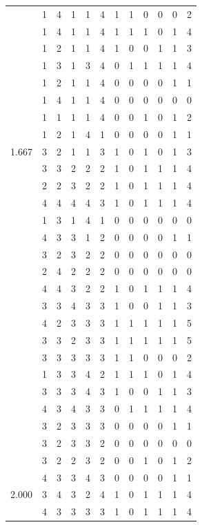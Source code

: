\documentclass[]{msu-thesis}
\theoremstyle{definition}
\theoremstyle{definition}
\theoremstyle{definition}
\theoremstyle{remark}
\begin{document}
\begin{table}
{\begin{tabular}[t]{rrrrrrrrrrrr}
 & 1 & 4 & 1 & 1 & 4 & 1 & 1 & 0 & 0 & 0 & 2\\
 & 1 & 4 & 1 & 1 & 4 & 1 & 1 & 1 & 0 & 1 & 4\\
 & 1 & 2 & 1 & 1 & 4 & 1 & 0 & 0 & 1 & 1 & 3\\
 & 1 & 3 & 1 & 3 & 4 & 0 & 1 & 1 & 1 & 1 & 4\\
 & 1 & 2 & 1 & 1 & 4 & 0 & 0 & 0 & 0 & 1 & 1\\
 & 1 & 4 & 1 & 1 & 4 & 0 & 0 & 0 & 0 & 0 & 0\\
 & 1 & 1 & 1 & 1 & 4 & 0 & 0 & 1 & 0 & 1 & 2\\
 & 1 & 2 & 1 & 4 & 1 & 0 & 0 & 0 & 0 & 1 & 1\\
1.667 & 3 & 2 & 1 & 1 & 3 & 1 & 0 & 1 & 0 & 1 & 3\\
 & 3 & 3 & 2 & 2 & 2 & 1 & 0 & 1 & 1 & 1 & 4\\
 & 2 & 2 & 3 & 2 & 2 & 1 & 0 & 1 & 1 & 1 & 4\\
 & 4 & 4 & 4 & 4 & 3 & 1 & 0 & 1 & 1 & 1 & 4\\
 & 1 & 3 & 1 & 4 & 1 & 0 & 0 & 0 & 0 & 0 & 0\\
 & 4 & 3 & 3 & 1 & 2 & 0 & 0 & 0 & 0 & 1 & 1\\
 & 3 & 2 & 3 & 2 & 2 & 0 & 0 & 0 & 0 & 0 & 0\\
 & 2 & 4 & 2 & 2 & 2 & 0 & 0 & 0 & 0 & 0 & 0\\
 & 4 & 4 & 3 & 2 & 2 & 1 & 0 & 1 & 1 & 1 & 4\\
 & 3 & 3 & 4 & 3 & 3 & 1 & 0 & 0 & 1 & 1 & 3\\
 & 4 & 2 & 3 & 3 & 3 & 1 & 1 & 1 & 1 & 1 & 5\\
 & 3 & 3 & 2 & 3 & 3 & 1 & 1 & 1 & 1 & 1 & 5\\
 & 3 & 3 & 3 & 3 & 3 & 1 & 1 & 0 & 0 & 0 & 2\\
 & 1 & 3 & 3 & 4 & 2 & 1 & 1 & 1 & 0 & 1 & 4\\
 & 3 & 3 & 3 & 4 & 3 & 1 & 0 & 0 & 1 & 1 & 3\\
 & 4 & 3 & 4 & 3 & 3 & 0 & 1 & 1 & 1 & 1 & 4\\
 & 3 & 2 & 3 & 3 & 3 & 0 & 0 & 0 & 0 & 1 & 1\\
 & 3 & 2 & 3 & 3 & 2 & 0 & 0 & 0 & 0 & 0 & 0\\
 & 3 & 2 & 2 & 3 & 2 & 0 & 0 & 1 & 0 & 1 & 2\\
 & 4 & 3 & 3 & 4 & 3 & 0 & 0 & 0 & 0 & 1 & 1\\
2.000 & 3 & 4 & 3 & 2 & 4 & 1 & 0 & 1 & 1 & 1 & 4\\
 & 4 & 3 & 3 & 3 & 3 & 1 & 0 & 1 & 1 & 1 & 4\\

\end{tabular}}
\end{table}
\end{document}
